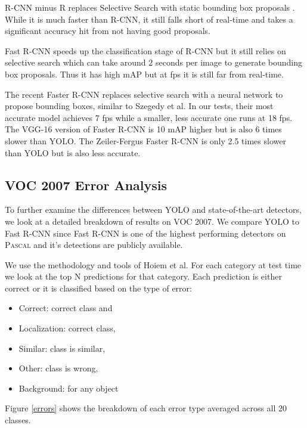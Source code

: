 \documentclass[10pt,twocolumn,letterpaper]{article}
\begin{document}
R-CNN minus R replaces Selective Search with static bounding box proposals \cite{lenc2015r}. While it is much faster than R-CNN, it still falls short of real-time and takes a significant accuracy hit from not having good proposals. 

Fast R-CNN speeds up the classification stage of R-CNN but it still relies on selective search which can take around 2 seconds per image to generate bounding box proposals. Thus it has high mAP but at  fps it is still far from real-time.

The recent Faster R-CNN replaces selective search with a neural network to propose bounding boxes, similar to Szegedy et al. \cite{erhan2014scalable} In our tests, their most accurate model achieves 7 fps while a smaller, less accurate one runs at 18 fps. The VGG-16 version of Faster R-CNN is 10 mAP higher but is also 6 times slower than YOLO. The Zeiler-Fergus Faster R-CNN is only 2.5 times slower than YOLO but is also less accurate.

\subsection{VOC 2007 Error Analysis}
\label{error}

To further examine the differences between YOLO and state-of-the-art detectors, we look at a detailed breakdown of results on VOC 2007. We compare YOLO to Fast R-CNN since Fast R-CNN is one of the highest performing detectors on \textsc{Pascal} and it's detections are publicly available.

We use the methodology and tools of Hoiem et al. \cite{hoiem2012diagnosing} For each category at test time we look at the top N predictions for that category. Each prediction is either correct or it is classified based on the type of error:

\begin{itemize}
\itemsep0em
\item Correct: correct class and 
\item Localization: correct class, 
\item Similar: class is similar, 
\item Other: class is wrong, 
\item Background:  for any object
\end{itemize}

Figure \ref{errors} shows the breakdown of each error type averaged across all 20 classes.
\end{document}
